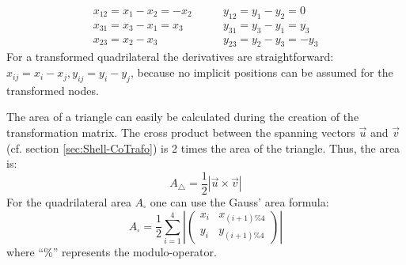    \begin{align*}
   x_{12} = x_1 - x_2 = -x_2 &\qquad y_{12} = y_1 - y_2 = 0\\
   x_{31} = x_3 - x_1 = x_3  &\qquad y_{31} = y_3 - y_1 = y_3\\
   x_{23} = x_2 - x_3        &\qquad y_{23} = y_2 - y_3 = -y_3
   \end{align*}
   For a transformed quadrilateral the derivatives are straightforward: $x_{ij} = x_i - x_j, y_{ij} = y_i - y_j$, because no implicit positions can be assumed for the transformed nodes.
   
   The area of a triangle can easily be calculated during the creation of the transformation matrix. The cross product between the spanning vectors $\vec{u}$ and $\vec{v}$ (cf. section \ref{sec:Shell-CoTrafo}) is 2 times the area of the triangle. Thus, the area is:
   \begin{equation*}
   A_\triangle = \frac{1}{2} \left|\vec{u} \times \vec{v}\right|
   \end{equation*}
   For the quadrilateral area $A_\square$ one can use the Gauss' area formula:
   \begin{equation*}
   A_\square = \frac{1}{2} \sum_{i=1}^{4} \left|\begin{pmatrix}
   x_i & x_{(i+1)\%4}\\
   y_i & y_{(i+1)\%4}
   \end{pmatrix}\right|
   \end{equation*}
   where ``\%'' represents the modulo-operator.
   
